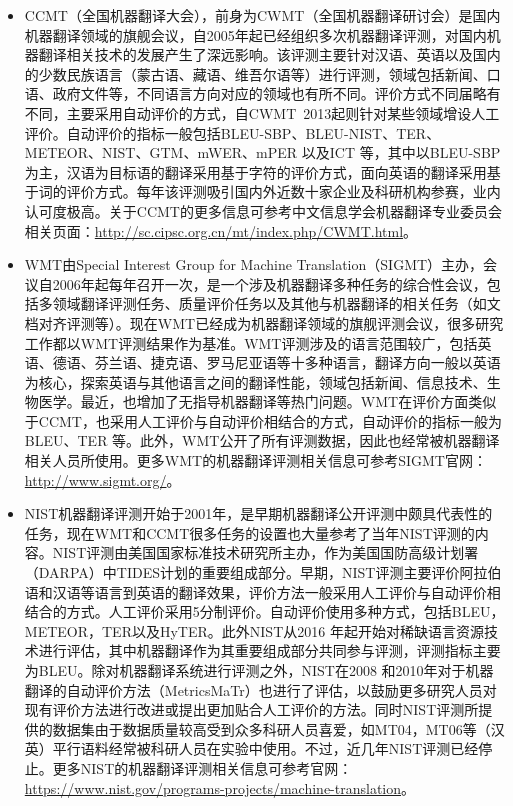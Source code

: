 \begin{appendices}
\begin{itemize}
\vspace{0.5em}
\item CCMT（全国机器翻译大会），前身为CWMT（全国机器翻译研讨会）是国内机器翻译领域的旗舰会议，自2005年起已经组织多次机器翻译评测，对国内机器翻译相关技术的发展产生了深远影响。该评测主要针对汉语、英语以及国内的少数民族语言（蒙古语、藏语、维吾尔语等）进行评测，领域包括新闻、口语、政府文件等，不同语言方向对应的领域也有所不同。评价方式不同届略有不同，主要采用自动评价的方式，自CWMT\ 2013起则针对某些领域增设人工评价。自动评价的指标一般包括BLEU-SBP、BLEU-NIST、TER、METEOR、NIST、GTM、mWER、mPER 以及ICT 等，其中以BLEU-SBP 为主，汉语为目标语的翻译采用基于字符的评价方式，面向英语的翻译采用基于词的评价方式。每年该评测吸引国内外近数十家企业及科研机构参赛，业内认可度极高。关于CCMT的更多信息可参考中文信息学会机器翻译专业委员会相关页面：\url{http://sc.cipsc.org.cn/mt/index.php/CWMT.html}。
\vspace{0.5em}
\item WMT由Special Interest Group for Machine Translation（SIGMT）主办，会议自2006年起每年召开一次，是一个涉及机器翻译多种任务的综合性会议，包括多领域翻译评测任务、质量评价任务以及其他与机器翻译的相关任务（如文档对齐评测等）。现在WMT已经成为机器翻译领域的旗舰评测会议，很多研究工作都以WMT评测结果作为基准。WMT评测涉及的语言范围较广，包括英语、德语、芬兰语、捷克语、罗马尼亚语等十多种语言，翻译方向一般以英语为核心，探索英语与其他语言之间的翻译性能，领域包括新闻、信息技术、生物医学。最近，也增加了无指导机器翻译等热门问题。WMT在评价方面类似于CCMT，也采用人工评价与自动评价相结合的方式，自动评价的指标一般为BLEU、TER 等。此外，WMT公开了所有评测数据，因此也经常被机器翻译相关人员所使用。更多WMT的机器翻译评测相关信息可参考SIGMT官网：\url{http://www.sigmt.org/}。
\vspace{0.5em}
\item NIST机器翻译评测开始于2001年，是早期机器翻译公开评测中颇具代表性的任务，现在WMT和CCMT很多任务的设置也大量参考了当年NIST评测的内容。NIST评测由美国国家标准技术研究所主办，作为美国国防高级计划署（DARPA）中TIDES计划的重要组成部分。早期，NIST评测主要评价阿拉伯语和汉语等语言到英语的翻译效果，评价方法一般采用人工评价与自动评价相结合的方式。人工评价采用5分制评价。自动评价使用多种方式，包括BLEU，METEOR，TER以及HyTER。此外NIST从2016 年起开始对稀缺语言资源技术进行评估，其中机器翻译作为其重要组成部分共同参与评测，评测指标主要为BLEU。除对机器翻译系统进行评测之外，NIST在2008 和2010年对于机器翻译的自动评价方法（MetricsMaTr）也进行了评估，以鼓励更多研究人员对现有评价方法进行改进或提出更加贴合人工评价的方法。同时NIST评测所提供的数据集由于数据质量较高受到众多科研人员喜爱，如MT04，MT06等（汉英）平行语料经常被科研人员在实验中使用。不过，近几年NIST评测已经停止。更多NIST的机器翻译评测相关信息可参考官网：\url{https://www.nist.gov/programs-projects/machine-translation}。

\end{itemize}
\end{appendices}
